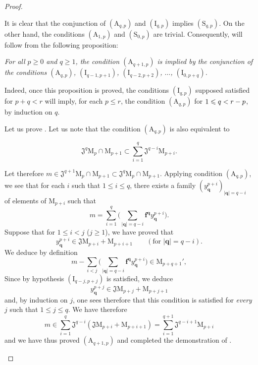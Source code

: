\begin{proof}
\begin{env}[19.5.5.3]
It is clear that the conjunction of $(\mathrm{A}_{q,p})$ and $(\mathrm{I}_{q,p})$ implies $(\mathrm{S}_{q,p})$. On the other hand, the conditions $(\mathrm{A}_{1,p})$ and $(\mathrm{S}_{0,p})$ are trivial. Consequently,  will follow from the following proposition:
\end{env}

\begin{env}[19.5.5.4]
\label{IV.19.5.5.4}
\emph{For all $p\geqslant 0$ and $q\geqslant 1$, the condition $(\mathrm{A}_{q+1,p})$ is implied by the conjunction of the conditions $(\mathrm{A}_{q,p})$, $(\mathrm{I}_{q-1,p+1})$, $(\mathrm{I}_{q-2,p+2})$, $\ldots$, $(\mathrm{I}_{0,p+q})$.}

Indeed, once this proposition is proved, the conditions $(\mathrm{I}_{q,p})$ supposed satisfied for $p+q<r$ will imply, for each $p\leqslant r$, the condition $(\mathrm{A}_{q,p})$ for $1\leqslant q<r- p$, by induction on $q$.

Let us prove . Let us note that the condition $(\mathrm{A}_{q,p})$ is also equivalent to
\end{env}

\begin{env}[19.5.5.5]
\label{IV.19.5.5.5}
\[
  \mathfrak{J}^q\mathrm{M}_p\cap\mathrm{M}_{p+1}\subset\textstyle\sum_{i=1}^{q}\mathfrak{J}^{q-i}\mathrm{M}_{p+i}.
\]

Let therefore $m\in\mathfrak{J}^{q+1}\mathrm{M}_p\cap\mathrm{M}_{p+1}\subset\mathfrak{J}^q\mathrm{M}_p\cap\mathrm{M}_{p+1}$. Applying condition $(\mathrm{A}_{q,p})$, we see that for each $i$ such that $1\leqslant i\leqslant q$, there exists a family $(y_\mathbf{q}^{p+i})_{|\mathbf{q}|=q-i}$ of elements of $\mathrm{M}_{p+i}$ such that
\[
  m=\textstyle\sum_{i=1}^{q}\bigl(\textstyle\sum_{|\mathbf{q}|=q-i}\mathbf{f}^\mathbf{q} y_\mathbf{q}^{p+i}\bigr).
\]
Suppose that for $1\leqslant i<j$ ($j\geqslant 1$), we have proved that
\[
  y_\mathbf{q}^{p+i}\in\mathfrak{J}\mathrm{M}_{p+i}+\mathrm{M}_{p+i+1}\qquad(\text{for }|\mathbf{q}|=q-i).
\]
We deduce by definition 
\[
  m-\textstyle\sum_{i<j}\bigl(\textstyle\sum_{|\mathbf{q}|=q-i}\mathbf{f}^\mathbf{q} y_\mathbf{q}^{p+i}\bigr)\in\mathrm{M}_{p+q+1}',
\]
Since by hypothesis $(\mathrm{I}_{q-j,p+j})$ is satisfied, we deduce
\[
  y_\mathbf{q}^{p+j}\in\mathfrak{J}\mathrm{M}_{p+j}+\mathrm{M}_{p+j+1}
\]
and, by induction on $j$, one sees therefore that this condition is satisfied for \emph{every} $j$ such that $1\leqslant j\leqslant q$. We have therefore
\[
  m\in\textstyle\sum_{i=1}^{q}\mathfrak{J}^{q-i}(\mathfrak{J}\mathrm{M}_{p+i}+\mathrm{M}_{p+i+1})=\textstyle\sum_{i=1}^{q+1}\mathfrak{J}^{q-i+1}\mathrm{M}_{p+i}
\]
and we have thus proved $(\mathrm{A}_{q+1,p})$ and completed the demonstration of .
\end{env}
\end{proof}

